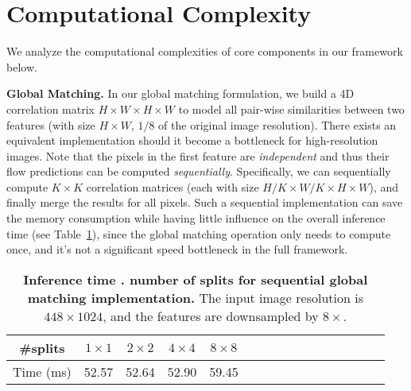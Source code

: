 \documentclass[10pt,twocolumn,letterpaper]{article}
\begin{document}
\section{Computational Complexity}

We analyze the computational complexities of core components in our framework below.

{\bf Global Matching.} In our global matching formulation, we build a 4D correlation matrix $H \times W \times H \times W$ to model all pair-wise similarities between two features (with size $H \times W$, $1/8$ of the original image resolution). There exists an equivalent implementation should it become a bottleneck for high-resolution images. Note that the pixels in the first feature are \emph{independent} and thus their flow predictions can be computed \emph{sequentially}. Specifically, we can sequentially compute $K \times K$ correlation matrices (each with size $H/K \times W/K \times H \times W$), and finally merge the results for all pixels. Such a sequential implementation can save the memory consumption while having little influence on the overall inference time (see Table~\ref{tab:seq_global_match}), since the global matching operation only needs to compute once, and it's not a significant speed bottleneck in the full framework.

\begin{table}[H]
    \centering
    \setlength{\tabcolsep}{3.pt} \begin{tabular}{cccccccccccccccc}
    \toprule
    
    \#splits & $1 \times 1$ & $2 \times 2$ & $4 \times 4$ & $8 \times 8$ \\
    
    \midrule
    
    Time (ms) & 52.57 & 52.64 & 52.90 & 59.45 \\
    
    \bottomrule
    \end{tabular}
    \vspace{-5pt}
    \caption{\textbf{Inference time \vs. number of splits for sequential global matching implementation.} The input image resolution is $448 \times 1024$, and the features are downsampled by $8 \times$.
    }
    \label{tab:seq_global_match}
    \vspace{-10pt}
    
\end{table}
\end{document}
